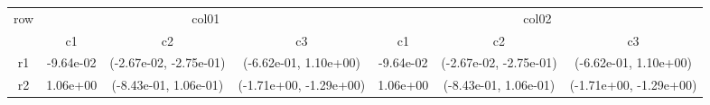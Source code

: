 \begin{tabular}{ccccccc}
\toprule
\multirow{2}{*}{row}&\multicolumn{3}{c}{col01}&\multicolumn{3}{c}{col02}\tabularnewline
\cmidrule(lr){2-4}
\cmidrule(lr){5-7}
&c1&c2&c3&c1&c2&c3\tabularnewline
\midrule
r1&-9.64e-02& (-2.67e-02, -2.75e-01)& (-6.62e-01, 1.10e+00)&-9.64e-02& (-2.67e-02, -2.75e-01)& (-6.62e-01, 1.10e+00)\tabularnewline
r2&1.06e+00& (-8.43e-01, 1.06e-01)& (-1.71e+00, -1.29e+00)&1.06e+00& (-8.43e-01, 1.06e-01)& (-1.71e+00, -1.29e+00)\tabularnewline
\bottomrule
\end{tabular}
